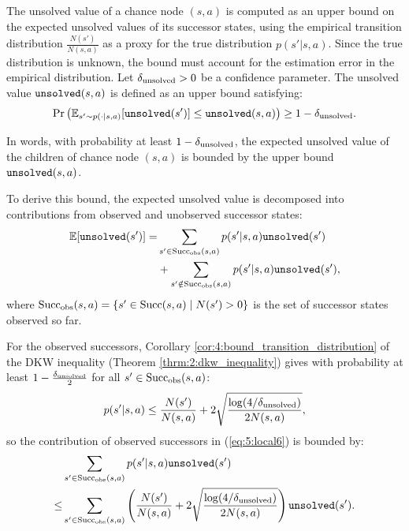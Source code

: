 

    The unsolved value of a chance node $(s,a)$ is computed as an upper bound on the expected unsolved values of its successor states, using the empirical transition distribution $\frac{N(s')}{N(s,a)}$ as a proxy for the true distribution $p(s'|s,a)$. Since the true distribution is unknown, the bound must account for the estimation error in the empirical distribution. Let ${\delta_{\textnormal{unsolved}}} > 0$ be a confidence parameter. The unsolved value ${\textnormal{\texttt{unsolved}}}(s,a)$ is defined as an upper bound satisfying:
    \begin{align}
        \Pr\left(\mathbb{E}_{s'\sim p(\cdot|s,a)}[{\textnormal{\texttt{unsolved}}}(s')] \leq {\textnormal{\texttt{unsolved}}}(s,a)\right) \geq 1-{\delta_{\textnormal{unsolved}}}. \label{eq:5:unsolved_chance_defn}
    \end{align}

    In words, with probability at least $1-{\delta_{\textnormal{unsolved}}}$, the expected unsolved value of the children of chance node $(s,a)$ is bounded by the upper bound ${\textnormal{\texttt{unsolved}}}(s,a)$.

    To derive this bound, the expected unsolved value is decomposed into contributions from observed and unobserved successor states:
    \begin{align}
        \mathbb{E}[{\textnormal{\texttt{unsolved}}}(s')] 
            =& \sum_{s'\in{\textnormal{Succ}_{\textnormal{obs}}(s,a)}} 
                p(s'|s,a){\textnormal{\texttt{unsolved}}}(s') \label{eq:5:local6} \\
            & + \sum_{s'\notin{\textnormal{Succ}_{\textnormal{obs}}(s,a)}} 
                p(s'|s,a){\textnormal{\texttt{unsolved}}}(s'), \label{eq:5:local7}
    \end{align}
    where ${\textnormal{Succ}_{\textnormal{obs}}(s,a)}= \{s'\in{\textnormal{Succ}(s,a)} \mid N(s') > 0\}$ is the set of successor states observed so far.

    For the observed successors, Corollary \ref{cor:4:bound_transition_distribution} of the DKW inequality (Theorem \ref{thrm:2:dkw_inequality}) gives with probability at least $1-\frac{{\delta_{\textnormal{unsolved}}}}{2}$ for all $s'\in{\textnormal{Succ}_{\textnormal{obs}}(s,a)}$:
    \begin{align}
        p(s'|s,a) \leq \frac{N(s')}{N(s,a)} + 
            2\sqrt{\frac{\log(4/{\delta_{\textnormal{unsolved}}})}{2N(s,a)}},
    \end{align}
    so the contribution of observed successors in (\ref{eq:5:local6}) is bounded by:
    \begin{align}
        &\sum_{s'\in{\textnormal{Succ}_{\textnormal{obs}}(s,a)}} 
            p(s'|s,a){\textnormal{\texttt{unsolved}}}(s') \\
        \leq & \sum_{s'\in{\textnormal{Succ}_{\textnormal{obs}}(s,a)}} 
            \left(\frac{N(s')}{N(s,a)} + 
            2\sqrt{\frac{\log(4/{\delta_{\textnormal{unsolved}}})}{2N(s,a)}}\right){\textnormal{\texttt{unsolved}}}(s').
    \end{align}

